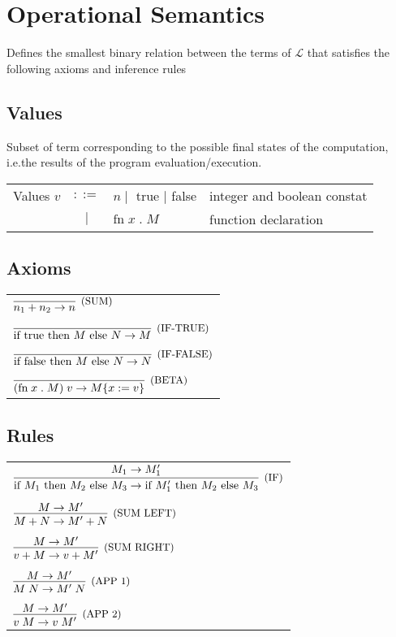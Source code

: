 \documentclass[11pt]{article}
\newcommand{\Lang}{\ensuremath{\mathcal{L}}}
\newcommand{\fn}[2]{\ensuremath{\text{fn}\; #1 \; . \; #2}}
\newcommand{\ifc}[3]{\ensuremath{\text{if } #1 \text{ then } #2 \text{ else } #3}}
\newcommand{\app}[2]{\ensuremath{ #1 \; #2}}
\newcommand{\true}{\ensuremath{\mbox{true}}}
\newcommand{\false}{\ensuremath{\mbox{false}}}
\newcommand{\inferr}[3]{\ensuremath{\infer[\text{\small{(#1)}}]{#2}{#3}}}
\newcommand{\subs}[2]{\ensuremath{\{ #1 := #2 \}}}
\begin{document}
\section*{Operational Semantics}
\label{sec:org39a16a6}
Defines the smallest binary relation between the terms of \(\Lang\)
that satisfies the following axioms and inference rules
\subsection*{Values}
\label{sec:org9c2b509}
Subset of term corresponding to the possible final states of the
computation, i.e.the results of the program evaluation/execution.
\begin{center}
\begin{tabular}{rcll}
Values \(v\) & \(::=\) & \(n \mid\) true \(\mid\) false & integer and boolean constat\\
 & \(\mid\) & \(\fn{x}{M}\) & function declaration\\
\end{tabular}

\end{center}

\subsection*{Axioms}
\label{sec:orgccb51ad}
\begin{center}
\begin{tabular}{l}
\(\inferr{SUM}{n_1 + n_2 \to n}{}\)\\
\\
\(\inferr{IF-TRUE}{\ifc{\true}{M}{N} \to M}{}\)\\
\\
\(\inferr{IF-FALSE}{\ifc{\false}{M}{N} \to N}{}\)\\
\\
\(\inferr{BETA}{\app{(\fn{x}{M})}{v} \to M\subs{x}{v}}{}\)\\
\end{tabular}

\end{center}

\subsection*{Rules}
\label{sec:orgd0a06e1}
\begin{center}
\begin{tabular}{l}
\(\inferr{IF}{\ifc{M_1}{M_2}{M_3} \to \ifc{M_1'}{M_2}{M_3}}{M_1 \to M_1'}\)\\
\\
\(\inferr{SUM LEFT}{M + N \to M' + N}{M \to M'}\)\\
\\
\(\inferr{SUM RIGHT}{v + M \to v + M'}{M \to M'}\)\\
\\
\(\inferr{APP 1}{\app{M}{N} \to \app{M'}{N}}{M \to M'}\)\\
\\
\(\inferr{APP 2}{\app{v}{M} \to \app{v}{M'}}{M \to M'}\)\\
\end{tabular}

\end{center}
\end{document}
